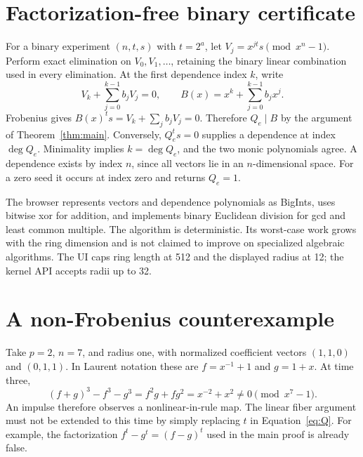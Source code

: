 \documentclass[11pt]{article}
\begin{document}


\clearpage
\appendix
\section{Factorization-free binary certificate}\label{app:krylov}
For a binary experiment $(n,t,s)$ with $t=2^a$, let $V_j=x^{jt}s\pmod{x^n-1}$. Perform exact elimination on $V_0,V_1,\ldots$, retaining the binary linear combination used in every elimination. At the first dependence index $k$, write
\begin{equation}
 V_k+\sum_{j=0}^{k-1}b_jV_j=0,
 \qquad B(x)=x^k+\sum_{j=0}^{k-1}b_jx^j.
\end{equation}
Frobenius gives $B(x)^t s=V_k+\sum_j b_jV_j=0$. Therefore $Q_e\mid B$ by the argument of Theorem~\ref{thm:main}. Conversely, $Q_e^t s=0$ supplies a dependence at index $\deg Q_e$. Minimality implies $k=\deg Q_e$, and the two monic polynomials agree. A dependence exists by index $n$, since all vectors lie in an $n$-dimensional space. For a zero seed it occurs at index zero and returns $Q_e=1$.

The browser represents vectors and dependence polynomials as BigInts, uses bitwise xor for addition, and implements binary Euclidean division for gcd and least common multiple. The algorithm is deterministic. Its worst-case work grows with the ring dimension and is not claimed to improve on specialized algebraic algorithms. The UI caps ring length at 512 and the displayed radius at 12; the kernel API accepts radii up to 32.

\section{A non-Frobenius counterexample}
Take $p=2$, $n=7$, and radius one, with normalized coefficient vectors $(1,1,0)$ and $(0,1,1)$. In Laurent notation these are $f=x^{-1}+1$ and $g=1+x$. At time three,
\begin{equation}
 (f+g)^3-f^3-g^3=f^2g+fg^2
  =x^{-2}+x^2\neq0\pmod{x^7-1}.
\end{equation}
An impulse therefore observes a nonlinear-in-rule map. The linear fiber argument must not be extended to this time by simply replacing $t$ in Equation~\eqref{eq:Q}. For example, the factorization $f^t-g^t=(f-g)^t$ used in the main proof is already false.

\clearpage
\end{document}
